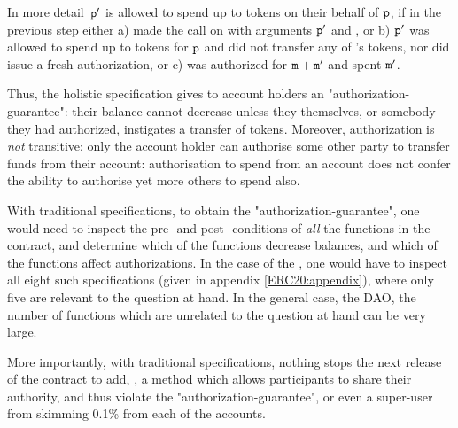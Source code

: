 In more detail\  ${\mbox{\tt{p}}}'$ is allowed to spend 
up to  tokens on their behalf of ${\mbox{\tt{p}}}$, if in the   previous step either a)
  made the call  on  
with arguments ${\mbox{\tt{p}}}'$ and , or b)  
${\mbox{\tt{p}}}'$ was allowed to spend  up to  tokens for ${\mbox{\tt{p}}}$
and did not transfer any of 's tokens, nor did  issue a fresh authorization,
or c)  was authorized for ${\mbox{\tt{m}}}+{\mbox{\tt{m}}}'$ and spent ${\mbox{\tt{m}}}'$. 
  
  \vspace{.1cm}
 
 Thus, the holistic specification gives to account holders an
 "authorization-guarantee": their balance cannot decrease unless they
 themselves, or somebody they had authorized, instigates a transfer of
 tokens. Moreover, authorization is {\em not} transitive: only the
 account holder can authorise some other party to transfer funds from
 their account: authorisation to spend from an account does not confer
 the ability to authorise yet more others to spend also.
 
 
 With traditional  specifications, to obtain the "authorization-guarantee", 
one would need to inspect the pre- and post- conditions of {\em all} the functions
in the contract, and determine which of the functions decrease balances, and which of the functions 
 affect authorizations.
 In the case of the , one would have to inspect all eight such specifications
 (given in appendix \ref{ERC20:appendix}), 
 where only five are relevant to the question at hand.
 In the general case, \eg the DAO, the number of   functions which are unrelated
 to the question at hand can be very large.
  
More importantly, with traditional  specifications, nothing stops the next release of the contract to add, 
\eg, a method which allows participants to share their authority, and thus
violate the "authorization-guarantee", or even a super-user from skimming 0.1\% from each of the accounts.


